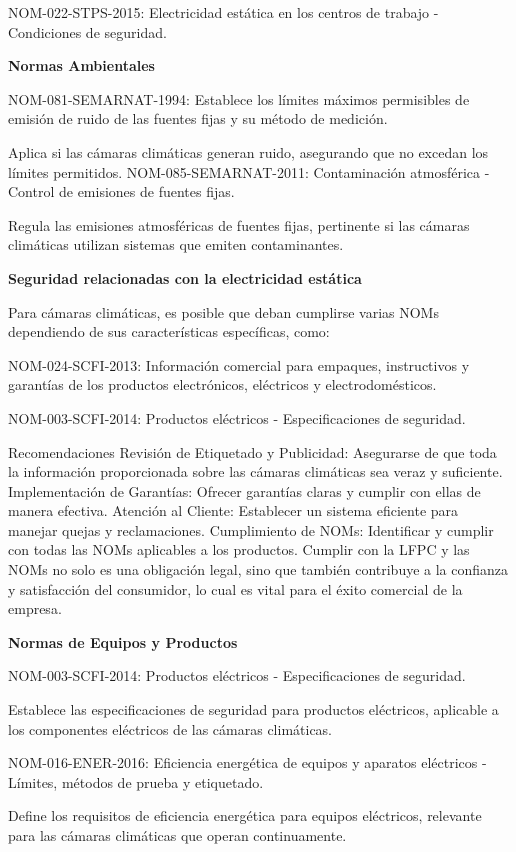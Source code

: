NOM-022-STPS-2015: Electricidad estática en los centros de trabajo - Condiciones de seguridad.

\textbf{Normas Ambientales}

NOM-081-SEMARNAT-1994: Establece los límites máximos permisibles de emisión de ruido de las fuentes fijas y su método de medición.

Aplica si las cámaras climáticas generan ruido, asegurando que no excedan los límites permitidos.
NOM-085-SEMARNAT-2011: Contaminación atmosférica - Control de emisiones de fuentes fijas.

Regula las emisiones atmosféricas de fuentes fijas, pertinente si las cámaras climáticas utilizan sistemas que emiten contaminantes.

\textbf{Seguridad relacionadas con la electricidad estática}

Para cámaras climáticas, es posible que deban cumplirse varias NOMs dependiendo de sus características específicas, como:

NOM-024-SCFI-2013: Información comercial para empaques, instructivos y garantías de los productos electrónicos, eléctricos y electrodomésticos.

NOM-003-SCFI-2014: Productos eléctricos - Especificaciones de seguridad.

Recomendaciones
Revisión de Etiquetado y Publicidad: Asegurarse de que toda la información proporcionada sobre las cámaras climáticas sea veraz y suficiente.
Implementación de Garantías: Ofrecer garantías claras y cumplir con ellas de manera efectiva.
Atención al Cliente: Establecer un sistema eficiente para manejar quejas y reclamaciones.
Cumplimiento de NOMs: Identificar y cumplir con todas las NOMs aplicables a los productos.
Cumplir con la LFPC y las NOMs no solo es una obligación legal, sino que también contribuye a la confianza y satisfacción del consumidor, lo cual es vital para el éxito comercial de la empresa.

\textbf{Normas de Equipos y Productos}

NOM-003-SCFI-2014: Productos eléctricos - Especificaciones de seguridad.

Establece las especificaciones de seguridad para productos eléctricos, aplicable a los componentes eléctricos de las cámaras climáticas.

NOM-016-ENER-2016: Eficiencia energética de equipos y aparatos eléctricos - Límites, métodos de prueba y etiquetado.

Define los requisitos de eficiencia energética para equipos eléctricos, relevante para las cámaras climáticas que operan continuamente.



